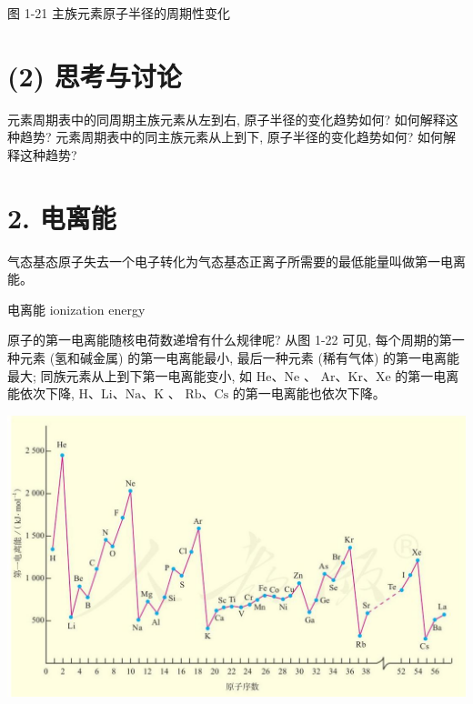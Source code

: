 \documentclass[10pt]{article}
\begin{document}
图 1-21 主族元素原子半径的周期性变化

\section*{(2) 思考与讨论}

元素周期表中的同周期主族元素从左到右, 原子半径的变化趋势如何? 如何解释这种趋势? 元素周期表中的同主族元素从上到下, 原子半径的变化趋势如何? 如何解释这种趋势?

\section*{2. 电离能}

气态基态原子失去一个电子转化为气态基态正离子所需要的最低能量叫做第一电离能。

\begin{mdframed}

电离能 ionization energy

\end{mdframed}

原子的第一电离能随核电荷数递增有什么规律呢? 从图 1-22 可见, 每个周期的第一种元素 (氢和碱金属) 的第一电离能最小, 最后一种元素 (稀有气体) 的第一电离能最大; 同族元素从上到下第一电离能变小, 如 \(\mathrm{{He}}\text{、}\mathrm{{Ne}}\) 、 \(\mathrm{{Ar}}\text{、}\mathrm{{Kr}}\text{、}\mathrm{{Xe}}\) 的第一电离能依次下降, \(\mathrm{H}\text{、}\mathrm{{Li}}\text{、}\mathrm{{Na}}\text{、}\mathrm{K}\) 、 \(\mathrm{{Rb}}\text{、}\mathrm{{Cs}}\) 的第一电离能也依次下降。

\begin{center}
\includegraphics[max width=1.0\textwidth]{images/0190e026-5a11-7df7-bd27-54d09026ba7a_26_460312.jpg}
\end{center}
\end{document}
